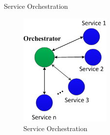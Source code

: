 \documentclass[xcolor=svgnames]{beamer}
\begin{document}

    \begin{frame}{Service Orchestration}
              \begin{figure}[!h]
                  \centering
                  \includegraphics[width=0.4\textwidth]{Orchestration.png}
                  \caption{Service Orchestration}
              \end{figure}	
  \end{frame}
\end{document}
